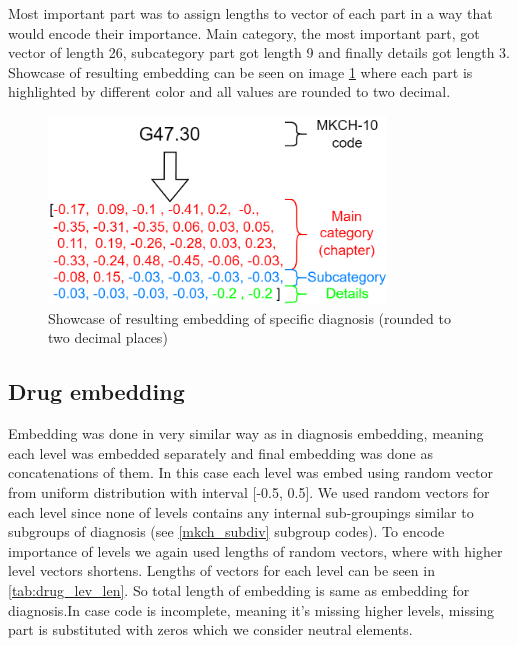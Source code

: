 Most important part was to assign lengths to vector of each part in a way that would encode their importance. 
Main category, the most important part, got vector of length 26, subcategory part got length 9 and finally details got length 3.
\\

Showcase of resulting embedding can be seen on image \ref{fig:diag_emb_show} where each part is highlighted by different color and all values are rounded to two decimal.

\begin{figure}[!h]
	\centering
	
	\includegraphics[width=0.8\textwidth]{images/diagnosis_embed_showcase.png} 
	
	\caption{Showcase of resulting embedding of specific diagnosis (rounded to two decimal places)}
	\label{fig:diag_emb_show}
\end{figure} 


\subsection{Drug embedding}

Embedding was done in very similar way as in diagnosis embedding, meaning each level was embedded separately and final embedding was done as concatenations of them. In this case each level was embed using random vector from uniform distribution with interval [-0.5, 0.5]. We used random vectors for each level since none of levels contains any internal sub-groupings similar to subgroups of diagnosis (see \ref{mkch_subdiv} subgroup codes). To encode importance of levels we again used lengths of random vectors, where with higher level vectors shortens. Lengths of vectors for each level can be seen in \ref{tab:drug_lev_len}. So total length of embedding is same as embedding for diagnosis.In case code is incomplete, meaning it's missing higher levels, missing part is substituted with zeros which we consider neutral elements.
\\

